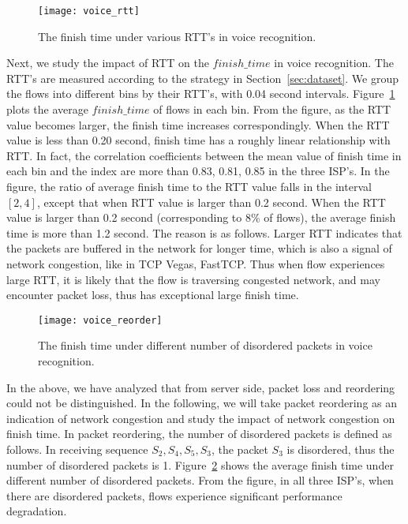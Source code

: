 \begin{figure}[!htbp]
\centering
	\texttt{[image: voice\_rtt]}
\caption{The finish time under various RTT's in voice recognition.}
\label{fig:voice_rtt}
\end{figure}

Next, we study the impact of RTT on the $finish\_time$ in voice recognition. The RTT's are measured according to the strategy in Section~\ref{sec:dataset}. We group the flows into different bins by their RTT's, with 0.04 second intervals. Figure~\ref{fig:voice_rtt} plots the average $finish\_time$ of flows in each bin. From the figure, as the RTT value becomes larger, the finish time increases correspondingly. When the RTT value is less than 0.20 second, finish time has a roughly linear relationship with RTT. In fact, the correlation coefficients between the mean value of finish time in each bin and the index are more than 0.83, 0.81, 0.85 in the three ISP's. In the figure, the ratio of average finish time to the RTT value falls in the interval $[2, 4]$, except that when RTT value is larger than 0.2 second. When the RTT value is larger than 0.2 second (corresponding to 8\% of flows), the average finish time is more than 1.2 second. The reason is as follows. Larger RTT indicates that the packets are buffered in the network for longer time, which is also a signal of network congestion, like in TCP Vegas\cite{brakmo1995tcp}, FastTCP\cite{wei2006fast}. Thus when flow experiences large RTT, it is likely that the flow is traversing congested network, and may encounter packet loss, thus has exceptional large finish time.

\begin{figure}[th]
\centering
\texttt{[image: voice\_reorder]}
\caption{The finish time under different number of disordered packets in voice recognition.}
\label{fig:voice_reorder}
\end{figure}

In the above, we have analyzed that from server side, packet loss and reordering could not be distinguished. In the following, we will take packet reordering as an indication of network congestion and study the impact of network congestion on finish time. In packet reordering, the number of disordered packets is defined as follows. In receiving sequence $S_2, S_4, S_5, S_3$, the packet $S_3$ is disordered, thus the number of disordered packets is 1. Figure~\ref{fig:voice_reorder} shows the average finish time under different number of disordered packets. From the figure, in all three ISP's, when there are disordered packets, flows experience significant performance degradation.

